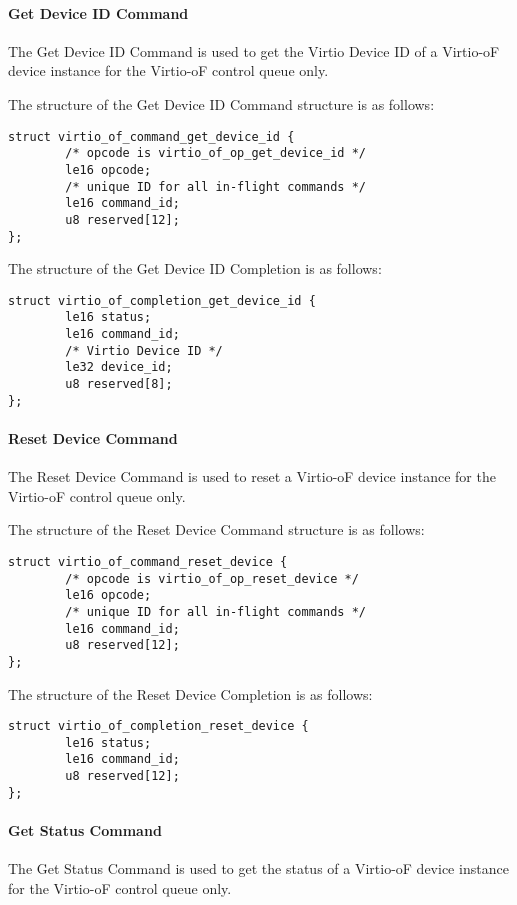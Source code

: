 \paragraph{Get Device ID Command}\label{sec:Virtio Transport Options / Virtio Over Fabrics / Commands Definition / Opcodes / Get Device ID Command}
The Get Device ID Command is used to get the Virtio Device ID of a Virtio-oF device instance for the Virtio-oF control queue only.

The structure of the Get Device ID Command structure is as follows:
\begin{lstlisting}
struct virtio_of_command_get_device_id {
        /* opcode is virtio_of_op_get_device_id */
        le16 opcode;
        /* unique ID for all in-flight commands */
        le16 command_id;
        u8 reserved[12];
};
\end{lstlisting}

The structure of the Get Device ID Completion is as follows:
\begin{lstlisting}
struct virtio_of_completion_get_device_id {
        le16 status;
        le16 command_id;
        /* Virtio Device ID */
        le32 device_id;
        u8 reserved[8];
};
\end{lstlisting}

\paragraph{Reset Device Command}\label{sec:Virtio Transport Options / Virtio Over Fabrics / Commands Definition / Opcodes / Reset Device Command}
The Reset Device Command is used to reset a Virtio-oF device instance for the Virtio-oF control queue only.

The structure of the Reset Device Command structure is as follows:
\begin{lstlisting}
struct virtio_of_command_reset_device {
        /* opcode is virtio_of_op_reset_device */
        le16 opcode;
        /* unique ID for all in-flight commands */
        le16 command_id;
        u8 reserved[12];
};
\end{lstlisting}

The structure of the Reset Device Completion is as follows:
\begin{lstlisting}
struct virtio_of_completion_reset_device {
        le16 status;
        le16 command_id;
        u8 reserved[12];
};
\end{lstlisting}

\paragraph{Get Status Command}\label{sec:Virtio Transport Options / Virtio Over Fabrics / Commands Definition / Opcodes / Get Status Command}
The Get Status Command is used to get the status of a Virtio-oF device instance for the Virtio-oF control queue only.

